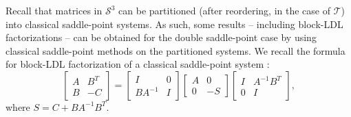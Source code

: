 \documentclass{article}
\newcommand{\st}{\mathcal{S}^3}
\newcommand{\sT}{\mathcal{T}}
\begin{document}
Recall that matrices in $\st$ can be partitioned (after reordering, in the case of $\sT$) into classical saddle-point systems. As such, some results -- including block-LDL factorizations -- can be obtained for the double saddle-point case by using classical saddle-point methods on the partitioned systems. We recall the formula for block-LDL factorization of a classical saddle-point system \cite[Eq. (3.1)]{bgl05}:
\begin{equation}
\label{eq:classical_ldl}
\begin{bmatrix}
    A & B^T \\
    B & -C
\end{bmatrix} = \begin{bmatrix}
    I & 0 \\
    BA^{-1} & I
\end{bmatrix} \begin{bmatrix}
    A & 0 \\
    0 & -S
\end{bmatrix}\begin{bmatrix}
    I & A^{-1}B^T \\
    0& I
\end{bmatrix},
\end{equation}
where $S = C+ BA^{-1}B^T$.
\end{document}
